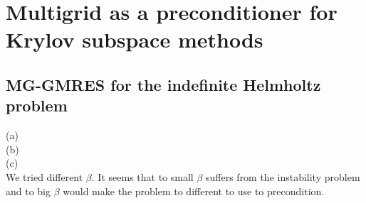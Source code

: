 \documentclass[a4paper,12pt]{article}
\begin{document}
\section{Multigrid as a preconditioner for Krylov subspace methods}

\subsection{MG-GMRES for the indefinite Helmholtz problem}
(a) \\
(b) \\
(c) \\
We tried different $\beta$. It seems that to small $\beta$ suffers from the instability problem and
to big $\beta$ would make the problem to different to use to precondition.
\end{document}
